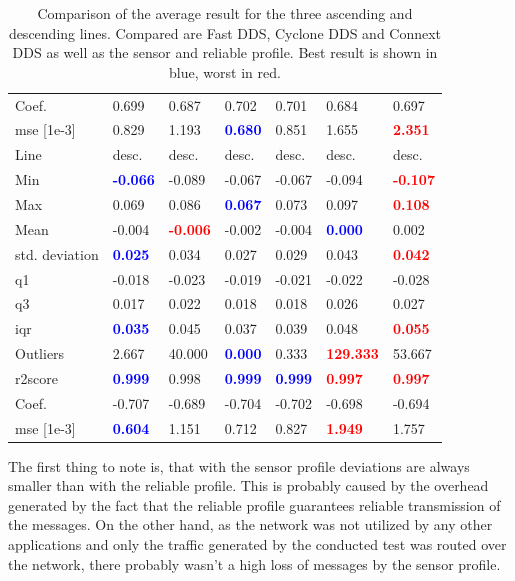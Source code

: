 \begin{table}[H]
\begin{tabular}{|l|ll|ll|ll|}
Coef. & 0.699 & 0.687 & 0.702 & 0.701 & 0.684 & 0.697 \\
\gls{mse} [1e-3] & 0.829 & 1.193 & \textcolor{blue}{\textbf{0.680}} & 0.851 & 1.655 & \textcolor{red}{\textbf{2.351}} \\
\midrule
Line & desc. & desc. & desc. & desc. & desc. & desc. \\
Min & \textcolor{blue}{\textbf{-0.066}} & -0.089 & -0.067 & -0.067 & -0.094 & \textcolor{red}{\textbf{-0.107}} \\
Max & 0.069 & 0.086 & \textcolor{blue}{\textbf{0.067}} & 0.073 & 0.097 & \textcolor{red}{\textbf{0.108}} \\
Mean & -0.004 & \textcolor{red}{\textbf{-0.006}} & -0.002 & -0.004 & \textcolor{blue}{\textbf{0.000}} & 0.002 \\
std. deviation & \textcolor{blue}{\textbf{0.025}} & 0.034 & 0.027 & 0.029 & 0.043 & \textcolor{red}{\textbf{0.042}} \\
\gls{q1} & -0.018 & -0.023 & -0.019 & -0.021 & -0.022 & -0.028 \\
\gls{q3} & 0.017 & 0.022 & 0.018 & 0.018 & 0.026 & 0.027 \\
\gls{iqr} & \textcolor{blue}{\textbf{0.035}} & 0.045 & 0.037 & 0.039 & 0.048 & \textcolor{red}{\textbf{0.055}} \\
Outliers & 2.667 & 40.000 & \textcolor{blue}{\textbf{0.000}} & 0.333 & \textcolor{red}{\textbf{129.333}} & 53.667 \\
\gls{r2}score & \textcolor{blue}{\textbf{0.999}} & 0.998 & \textcolor{blue}{\textbf{0.999}} & \textcolor{blue}{\textbf{0.999}} & \textcolor{red}{\textbf{0.997}} & \textcolor{red}{\textbf{0.997}} \\
Coef. & -0.707 & -0.689 & -0.704 & -0.702 & -0.698 & -0.694 \\
\gls{mse} [1e-3] & \textcolor{blue}{\textbf{0.604}} & 1.151 & 0.712 & 0.827 & \textcolor{red}{\textbf{1.949}} & 1.757 \\
\bottomrule
\end{tabular}
    \centering
    \caption{Comparison of the average result for the three ascending and descending lines. Compared are Fast DDS, Cyclone DDS and Connext DDS as well as the sensor and reliable profile. Best result is shown in blue, worst in red.}
    \label{c6_tab_result_overview}
\end{table}
The first thing to note is, that with the sensor profile deviations are always smaller than with the reliable profile. This is probably caused by the overhead generated by the fact that the reliable profile guarantees reliable transmission of the messages. On the other hand, as the network was not utilized by any other applications and only the traffic generated by the conducted test was routed over the network, there probably wasn't a high loss of messages by the sensor profile.\newline
